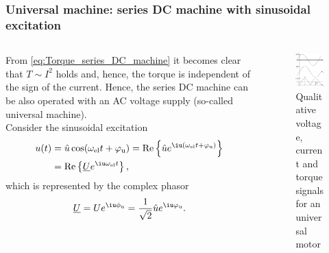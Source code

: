 \begin{frame}
	\frametitle{Universal machine: series DC machine with sinusoidal excitation}
	\begin{columns}
		\begin{column}{0.55\textwidth}
		From \eqref{eq:Torque_series_DC_machine} it becomes clear that $T\sim I^2$ holds and, hence, the torque is independent of the sign of the current. Hence, the series DC machine can be also operated with an AC voltage supply (so-called universal machine).
		\\[1em] \pause 
		Consider the sinusoidal excitation 
		\begin{align*}
			u(t) &= \hat{u} \cos(\omega_\mathrm{el} t+ \varphi_{\mathrm{u}}) = \mathrm{Re}\left\{\hat{u} e^{\iu (\omega_\mathrm{el} t + \varphi_{\mathrm{u}})}\right\}\\ &= \mathrm{Re}\left\{\underline{U} e^{\iu \omega_\mathrm{el} t}\right\},	
		\end{align*} \pause
		which is represented by the complex phasor 
		\begin{equation}
			\underline{U} = U e ^{\iu \phi_{\mathrm{u}}} = \frac{1}{\sqrt{2}}\hat{u} e ^{\iu \varphi_{\mathrm{u}}}. 
		\end{equation}
\end{column}
\hfill \pause
\begin{column}{0.45\textwidth}
	\begin{figure}
		\centering
		\includegraphics[scale=1.05]{fig/lec03/Universal_machine_time_signals.pdf}
		\caption{Qualitative voltage, current and torque signals for an universal motor}
	\end{figure}
\end{column}
\end{columns}
\end{frame}


